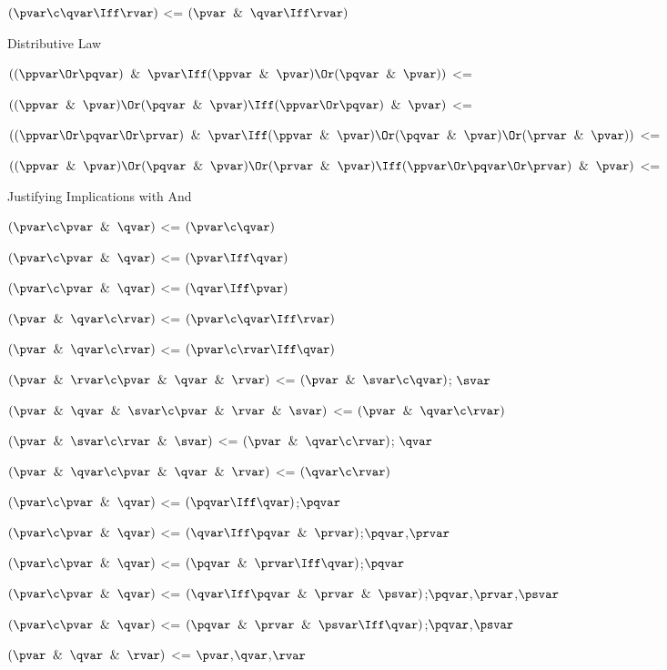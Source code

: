 $(\pvar \c \qvar \Iff \rvar)$ <= $(\pvar \And \qvar \Iff \rvar)$

\lineb

Distributive Law

$((\ppvar \Or \pqvar )\And \pvar \Iff (\ppvar \And \pvar)\Or (\pqvar \And \pvar))$ <=

$((\ppvar \And \pvar)\Or (\pqvar \And \pvar)\Iff (\ppvar \Or \pqvar )\And \pvar )$ <=

$((\ppvar \Or \pqvar \Or \prvar)\And \pvar \Iff (\ppvar \And \pvar)\Or (\pqvar \And \pvar)\Or (\prvar \And \pvar))$ <=

$((\ppvar \And \pvar)\Or (\pqvar \And \pvar)\Or (\prvar \And \pvar)\Iff (\ppvar \Or \pqvar\Or \prvar )\And \pvar )$ <=

\lineb



Justifying Implications with And
\lineb

$(\pvar \c \pvar \And \qvar)$ <= $(\pvar \c \qvar)$

$(\pvar \c \pvar \And \qvar)$ <= $(\pvar \Iff \qvar)$

$(\pvar \c \pvar \And \qvar)$ <= $(\qvar \Iff \pvar)$

$(\pvar \And \qvar \c \rvar)$ <= $(\pvar \c \qvar \Iff \rvar)$

$(\pvar \And \qvar \c \rvar)$ <= $(\pvar \c \rvar \Iff \qvar)$

$(\pvar \And \rvar \c \pvar \And \qvar \And \rvar)$ <= $(\pvar\And \svar\c \qvar)$; $\svar$

$(\pvar \And \qvar \And \svar \c \pvar \And \rvar \And \svar)$ <= $(\pvar \And \qvar \c \rvar)$

$(\pvar \And \svar\c \rvar\And \svar)$ <= $(\pvar \And \qvar \c \rvar)$; $\qvar$

$(\pvar \And \qvar \c \pvar \And \qvar \And \rvar)$ <= $(\qvar \c \rvar)$

$(\pvar \c \pvar \And \qvar)$ <= $(\pqvar \Iff \qvar)$;$\pqvar$

$(\pvar \c \pvar \And \qvar)$ <= $(\qvar \Iff \pqvar\And\prvar)$;$\pqvar$,$\prvar$

$(\pvar \c \pvar \And \qvar)$ <= $(\pqvar \And \prvar\Iff \qvar)$;$\pqvar$

$(\pvar \c \pvar \And \qvar)$ <= $(\qvar \Iff \pqvar\And\prvar \And\psvar  )$;$\pqvar$,$\prvar$,$\psvar$

$(\pvar \c \pvar \And \qvar)$ <= $(\pqvar \And \prvar \And \psvar \Iff \qvar)$;$\pqvar$,$\psvar$

$(\pvar \And \qvar \And \rvar)$ <= $\pvar$,$\qvar$,$\rvar$

